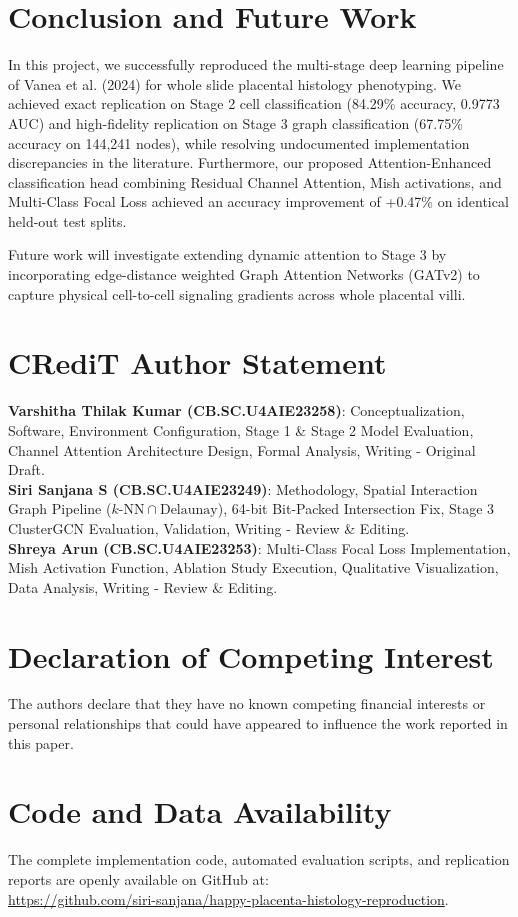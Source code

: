 \documentclass[a4paper,fleqn]{cas-sc}
\begin{document}
\section{Conclusion and Future Work}
In this project, we successfully reproduced the multi-stage deep learning pipeline of Vanea et al. (2024) for whole slide placental histology phenotyping. We achieved exact replication on Stage 2 cell classification (84.29\% accuracy, 0.9773 AUC) and high-fidelity replication on Stage 3 graph classification (67.75\% accuracy on 144,241 nodes), while resolving undocumented implementation discrepancies in the literature. Furthermore, our proposed Attention-Enhanced classification head combining Residual Channel Attention, Mish activations, and Multi-Class Focal Loss achieved an accuracy improvement of +0.47\% on identical held-out test splits.

Future work will investigate extending dynamic attention to Stage 3 by incorporating edge-distance weighted Graph Attention Networks (GATv2) to capture physical cell-to-cell signaling gradients across whole placental villi.

\section*{CRediT Author Statement}
\textbf{Varshitha Thilak Kumar (CB.SC.U4AIE23258)}: Conceptualization, Software, Environment Configuration, Stage 1 \& Stage 2 Model Evaluation, Channel Attention Architecture Design, Formal Analysis, Writing - Original Draft. \\
\textbf{Siri Sanjana S (CB.SC.U4AIE23249)}: Methodology, Spatial Interaction Graph Pipeline ($k\text{-NN} \cap \text{Delaunay}$), 64-bit Bit-Packed Intersection Fix, Stage 3 ClusterGCN Evaluation, Validation, Writing - Review \& Editing. \\
\textbf{Shreya Arun (CB.SC.U4AIE23253)}: Multi-Class Focal Loss Implementation, Mish Activation Function, Ablation Study Execution, Qualitative Visualization, Data Analysis, Writing - Review \& Editing.

\section*{Declaration of Competing Interest}
The authors declare that they have no known competing financial interests or personal relationships that could have appeared to influence the work reported in this paper.

\section*{Code and Data Availability}
The complete implementation code, automated evaluation scripts, and replication reports are openly available on GitHub at: \\
\url{https://github.com/siri-sanjana/happy-placenta-histology-reproduction}.



\end{document}

